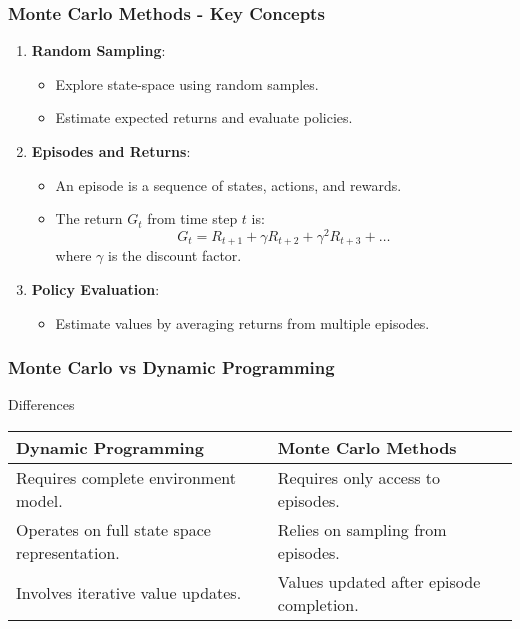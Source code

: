 \documentclass[aspectratio=169]{beamer}
\begin{document}
\begin{frame}[fragile]
    \frametitle{Monte Carlo Methods - Key Concepts}
    \begin{enumerate}
        \item \textbf{Random Sampling}: 
            \begin{itemize}
                \item Explore state-space using random samples.
                \item Estimate expected returns and evaluate policies.
            \end{itemize}
        \item \textbf{Episodes and Returns}:
            \begin{itemize}
                \item An episode is a sequence of states, actions, and rewards.
                \item The return \( G_t \) from time step \( t \) is:
                \begin{equation}
                    G_t = R_{t+1} + \gamma R_{t+2} + \gamma^2 R_{t+3} + \ldots
                \end{equation}
                where \( \gamma \) is the discount factor.
            \end{itemize}
        \item \textbf{Policy Evaluation}: 
            \begin{itemize}
                \item Estimate values by averaging returns from multiple episodes.
            \end{itemize}
    \end{enumerate}
\end{frame}

\begin{frame}[fragile]
    \frametitle{Monte Carlo vs Dynamic Programming}
    \begin{block}{Differences}
        \begin{tabular}{|l|l|}
            \hline
            \textbf{Dynamic Programming} & \textbf{Monte Carlo Methods} \\
            \hline
            Requires complete environment model. & Requires only access to episodes. \\
            Operates on full state space representation. & Relies on sampling from episodes. \\
            Involves iterative value updates. & Values updated after episode completion. \\
            \hline
        \end{tabular}
    \end{block}
\end{frame}
\end{document}
